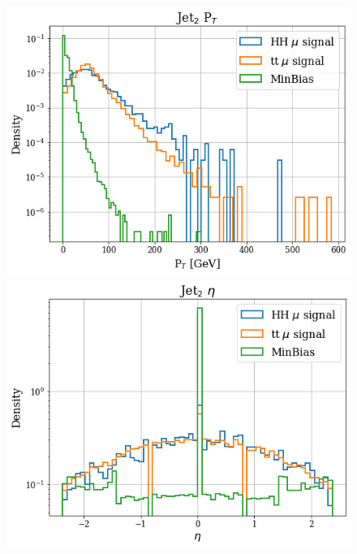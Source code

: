 \documentclass[../main.tex]{subfiles}
\begin{document}
 
 \begin{figure}[!ht]
  \begin{minipage}[b]{0.33\linewidth}
    \centering
    \includegraphics[width=1\linewidth]{Chapters/Plots/Hist_1mu_jet2_Et.png}
  \end{minipage}%
  \begin{minipage}[b]{0.33\linewidth}
    \centering
    \includegraphics[width=1\linewidth]{Chapters/Plots/Hist_1mu_jet2_Eta.png}
  \end{minipage} %
  \begin{minipage}[b]{0.33\linewidth}

\end{minipage}
\end{figure}
\end{document}
